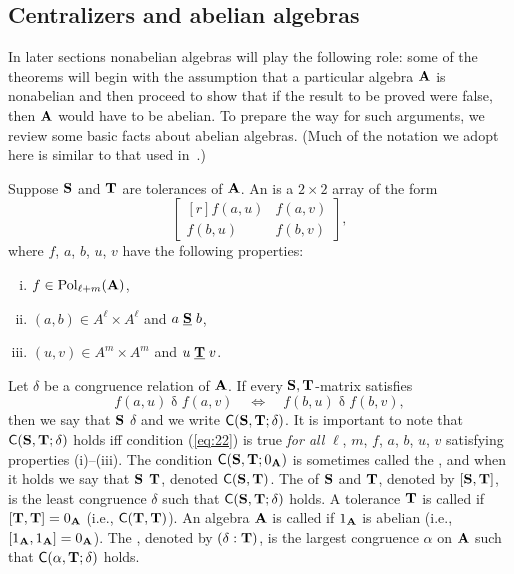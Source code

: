 \subsection{Centralizers and abelian algebras}
In later sections nonabelian algebras will play the following role:
some of the theorems will begin with the assumption 
that a particular algebra $\mathbf{A}$ is nonabelian and then proceed to show that 
if the result to be proved were false, then $\mathbf{A}$ would have to be abelian. 
To prepare the way for such arguments, we review some basic facts about abelian
algebras. (Much of the notation we adopt here is similar to that used
in~\cite{MR3076179}.)

Suppose $\mathbf{S}$ and $\mathbf{T}$ are tolerances of $\mathbf{A}$.  An  
is a $2\times 2$ array of the form
\[
\begin{bmatrix*}[r] f(a,u) & f(a,v)\\ f(b,u)&f(b,v)\end{bmatrix*},
\]
where $f$, $a$, $b$, $u$, $v$ have the following properties:
\begin{enumerate}[(i)]
\item $f\in \operatorname{Pol}_{\ell + m}(\mathbf{A})$,
\item $(a, b)\in A^\ell\times A^\ell$ and $a \mathrel{\underline{\mathbf{S}}} b$,
\item $(u, v)\in A^m\times A^m$ and $u \mathrel{\underline{\mathbf{T}}} v$.
\end{enumerate}
Let $\delta$ be a congruence relation of $\mathbf{A}$.
If every $\mathbf{S},\mathbf{T}$-matrix satisfies
\begin{equation}
  \label{eq:22}
f(a,u) \mathrel{\delta} f(a,v)\quad \iff \quad f(b,u) \mathrel{\delta} f(b,v),
\end{equation}
then we say that $\mathbf{S}$  $\delta$ and we write 
$\mathsf{C}(\mathbf{S}, \mathbf{T}; \delta)$.
It is important to note that $\mathsf{C}(\mathbf{S}, \mathbf{T}; \delta)$ holds iff condition
(\ref{eq:22}) is true \emph{for all}
$\ell$, $m$, $f$, $a$, $b$, $u$, $v$ satisfying properties (i)--(iii).
The condition $\mathsf{C}(\mathbf{S}, \mathbf{T}; 0_{\mathbf{A}})$ is sometimes called the 
, and when it holds we say  that
$\mathbf{S}$  $\mathbf{T}$, denoted
$\mathsf{C}(\mathbf{S}, \mathbf{T})$.
The  of $\mathbf{S}$ and $\mathbf{T}$, denoted by $[\mathbf{S}, \mathbf{T}]$,
is the least congruence $\delta$ such that $\mathsf{C}(\mathbf{S}, \mathbf{T}; \delta)$ 
holds.  A tolerance $\mathbf{T}$ is called  if
$[\mathbf{T}, \mathbf{T}] = 0_{\mathbf{A}}$ (i.e., $\mathsf{C}(\mathbf{T}, \mathbf{T})$). 
An algebra $\mathbf{A}$ is called  if $1_{\mathbf{A}}$ is abelian
(i.e., $[1_{\mathbf{A}}, 1_{\mathbf{A}}] = 0_{\mathbf{A}}$).
The , denoted by
$(\delta : \mathbf{T} )$, is the largest congruence $\alpha$ on $\mathbf{A}$ such that 
$\mathsf{C}(\alpha, \mathbf{T} ; \delta)$ holds.


